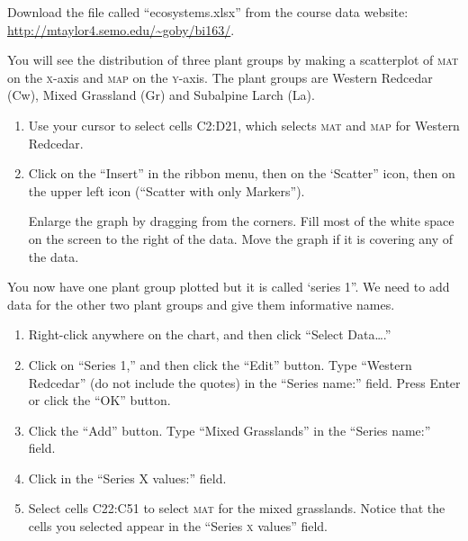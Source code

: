 \documentclass[12pt, hidelinks]{exam}
\newcommand*\AnswerBox[2]{%
	\parbox[t][#1]{0.92\textwidth}{%
		\begin{solution}#2\end{solution}
		\vskip\stretch{1}}
}
\newcommand*\axis[1]{{\scshape #1}-axis}
\begin{document}
\begin{questions}

Download the file called “ecosystems.xlsx” from the course data website:\\ \url{http://mtaylor4.semo.edu/~goby/bi163/}.\bigskip

You will see the distribution of three plant groups by making a scatterplot of \textsc{mat} on the \axis{x} and \textsc{map} on the \axis{y}. %
The plant groups are Western Redcedar (Cw), Mixed Grassland (Gr) and Subalpine Larch (La). 

\begin{enumerate}
	\item Use your cursor to select cells {\liningnum C2:D21}, which selects \textsc{mat} and \textsc{map} for Western Redcedar.

	\item Click on the “Insert” in the ribbon menu, then on the ‘Scatter” icon, then on the upper left icon (“Scatter with only Markers”).

	Enlarge the graph by dragging from the corners. Fill most of the white space on the screen to the right of the data. Move the graph if it is covering any of the data. 
\end{enumerate}

You now have one plant group plotted but it is called ‘series 1”. We need to add data for the other two plant groups and give them informative names. 

\begin{enumerate}[resume]
	\item Right-click anywhere on the chart, and then click “Select Data\dots.”

	\item Click on “Series 1,” and then click the “Edit” button. Type “Western Redcedar” (do not include the quotes) in the “Series name:” field. Press Enter or click the “OK” button.

	\item Click the “Add” button. Type “Mixed Grasslands” in the “Series name:” field.

	\item Click in the “Series X values:” field.

	\item Select cells {\liningnum C22:C51} to select \textsc{mat} for the mixed grasslands. Notice that the cells you selected appear in the “Series \textsc{x} values” field.


\end{enumerate}
\end{questions}
\end{document}
